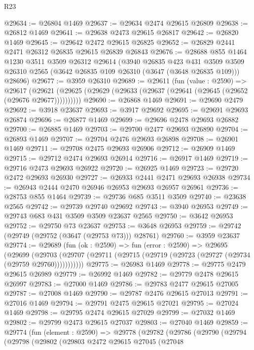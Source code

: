 \begin{lexlean}{R23}
\begin{coremodule}
@29634 := @26804 @1469
@29637 := @29634 @2474 @29615 @26809
@29638 := @26812 @1469
@29641 := @29638 @2473 @29615 @26817
@29642 := @26820 @1469
@29645 := @29642 @2472 @29615 @26825
@29652 := @26829 @2441 @2471 @26312 @26835 @29615 @26839 @26843
@29676 := @28688
    @855
    @1464
    @1230
    @3511
    @3509
    @26312
    @29614
    (@3940
      @26835
      @423
      @431
      @3509
      @3509
      @26310
      @2565
      (@3642 @26835 @109 @26310 (@3647 (@3648 @26835 @109)))
      @28696)
@29677 := @3959 @26310
@29689 := @29611
    (fun (value : @2590) =>
    @29617 (@29621 (@29625 (@29629 (@29633 (@29637 (@29641 (@29645 (@29652 (@29676 @29677))))))))))
@29690 := @26868 @1469
@29691 := @29690 @2479
@29692 := @3918 @23637
@29693 := @3917 @29692
@29695 := @29691 @29693 @26874
@29696 := @26877 @1469
@29699 := @29696 @2478 @29693 @26882
@29700 := @26885 @1469
@29703 := @29700 @2477 @29693 @26890
@29704 := @26893 @1469
@29707 := @29704 @2476 @29693 @26898
@29708 := @26901 @1469
@29711 := @29708 @2475 @29693 @26906
@29712 := @26909 @1469
@29715 := @29712 @2474 @29693 @26914
@29716 := @26917 @1469
@29719 := @29716 @2473 @29693 @26922
@29720 := @26925 @1469
@29723 := @29720 @2472 @29693 @26930
@29727 := @26933 @2441 @2471 @29693 @26938
@29734 := @26943 @2444 @2470 @26946 @26953 @29693 @26957 @26961
@29736 := @28753 @855 @1464
@29739 := @29736 @685 @3511 @3509
@29740 := @23638 @2565
@29742 := @29739 @29740 @29692
@29743 := @3940 @26953
@29749 := @29743 @683 @431 @3509 @3509 @23637 @2565
@29750 := @3642 @26953
@29752 := @29750 @73 @23637
@29753 := @3648 @26953
@29759 := @29742 (@29749 (@29752 (@3647 (@29753 @73))) @28761)
@29760 := @3959 @23637
@29774 := @29689
    (fun (ok : @2590) =>
    fun (error : @2590) =>
    @29695
      (@29699
        (@29703 (@29707 (@29711 (@29715 (@29719 (@29723 (@29727 (@29734 (@29759 @29760)))))))))))
@29775 := @26983 @1469
@29778 := @29775 @2479 @29615 @26989
@29779 := @26992 @1469
@29782 := @29779 @2478 @29615 @26997
@29783 := @27000 @1469
@29786 := @29783 @2477 @29615 @27005
@29787 := @27008 @1469
@29790 := @29787 @2476 @29615 @27013
@29791 := @27016 @1469
@29794 := @29791 @2475 @29615 @27021
@29795 := @27024 @1469
@29798 := @29795 @2474 @29615 @27029
@29799 := @27032 @1469
@29802 := @29799 @2473 @29615 @27037
@29803 := @27040 @1469
@29859 := @29774
    (fun (element : @2590) =>
    @29778
      (@29782
        (@29786
          (@29790
            (@29794
              (@29798
                (@29802
                  (@29803
                    @2472
                    @29615
                    @27045
                    (@27048

\end{coremodule}
\end{lexlean}
